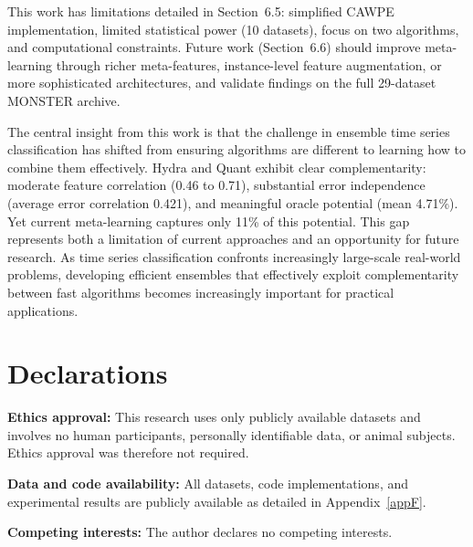 \documentclass[pdflatex,sn-basic]{sn-jnl}           %
\theoremstyle{thmstyleone}%
\theoremstyle{thmstyletwo}%
\theoremstyle{thmstylethree}%
\begin{document}
This work has limitations detailed in Section~6.5: simplified CAWPE implementation, limited statistical power (10 datasets), focus on two algorithms, and computational constraints. Future work (Section~6.6) should improve meta-learning through richer meta-features, instance-level feature augmentation, or more sophisticated architectures, and validate findings on the full 29-dataset MONSTER archive.

The central insight from this work is that the challenge in ensemble time series classification has shifted from ensuring algorithms are different to learning how to combine them effectively. Hydra and Quant exhibit clear complementarity: moderate feature correlation (0.46 to 0.71), substantial error independence (average error correlation 0.421), and meaningful oracle potential (mean 4.71\%). Yet current meta-learning captures only 11\% of this potential. This gap represents both a limitation of current approaches and an opportunity for future research. As time series classification confronts increasingly large-scale real-world problems, developing efficient ensembles that effectively exploit complementarity between fast algorithms becomes increasingly important for practical applications.

\backmatter

\section*{Declarations}

\noindent
\textbf{Ethics approval:} This research uses only publicly available datasets and involves no human participants, personally identifiable data, or animal subjects. Ethics approval was therefore not required.

\bigskip

\noindent
\textbf{Data and code availability:} All datasets, code implementations, and experimental results are publicly available as detailed in Appendix~\ref{appF}.

\bigskip

\noindent
\textbf{Competing interests:} The author declares no competing interests.

\clearpage
\end{document}
